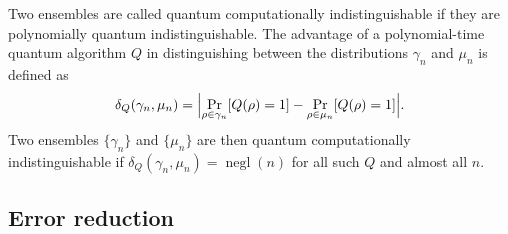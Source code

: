 \documentclass[11pt]{article}
\theoremstyle{plain}
\theoremstyle{definition}
\DeclareMathOperator{\negl}{negl} %
\DeclarePairedDelimiter{\abs}{\lvert}{\rvert}
\begin{document}
Two ensembles are called quantum computationally indistinguishable if they are polynomially quantum indistinguishable. The advantage of a polynomial-time quantum algorithm $Q$ in distinguishing between the distributions $\gamma_n$ and $\mu_n$ is defined as
\[ \delta_Q(\gamma_n, \mu_n) = \abs[\Big]{ \Pr_{\rho \in \gamma_n}[Q(\rho) = 1] - \Pr_{\rho \in \mu_n}[Q(\rho) = 1] }. \]
Two ensembles $\{ \gamma_n \}$ and $\{ \mu_n \}$ are then quantum computationally indistinguishable if $\delta_Q(\gamma_n, \mu_n) = \negl(n)$ for all such $Q$ and almost all $n$. 



\subsection{Error reduction}
\label{sec:err-red}
\end{document}
